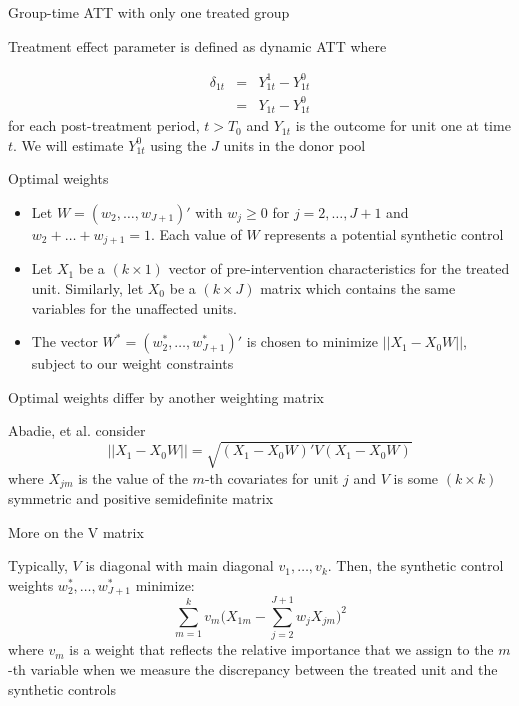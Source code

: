 \documentclass{beamer}
\begin{document}
\begin{frame}{Group-time ATT with only one treated group}

Treatment effect parameter is defined as dynamic ATT where 

\begin{eqnarray*}
\delta_{1t}&=&Y_{1t}^1 - Y_{1t}^0 \\
&=& Y_{1t} - Y_{1t}^0 
\end{eqnarray*} for each post-treatment period, $t>T_0$ and $Y_{1t}$ is the outcome for unit one at time $t$. We will estimate $Y^0_{1t}$ using the $J$ units in the donor pool 

\end{frame}

\begin{frame}{Optimal weights}
	
	\begin{itemize}
	\item Let $W=(w_2, \dots, w_{J+1})'$ with $w_j\geq 0$ for $j=2, \dots, J+1$ and $w_2+\dots+w_{j+1}=1$. Each value of $W$ represents a potential synthetic control
	\item Let $X_1$ be a $(k\times 1)$ vector of pre-intervention characteristics for the treated unit.  Similarly, let $X_0$ be a $(k\times J)$ matrix which contains the same variables for the unaffected units.
	\item The vector $W^*=(w_2^*, \dots, w_{J+1}^*)'$ is chosen to minimize $||X_1-X_0W||$, subject to our weight constraints
	\end{itemize}
\end{frame}

\begin{frame}{Optimal weights differ by another weighting matrix}
	
Abadie, et al. consider $$||X_1 - X_0W||=\sqrt{(X_1-X_0W)'V(X_1-X_0W)}$$where $X_{jm}$ is the value of the $m$-th covariates for unit $j$ and $V$ is some $(k\times k)$ symmetric and positive semidefinite matrix

\end{frame}

\begin{frame}{More on the V matrix}

Typically, $V$ is diagonal with main diagonal $v_1, \dots, v_k$.  Then, the synthetic control weights $w_2^*, \dots, w_{J+1}^*$ minimize: $$\sum_{m=1}^k v_m \bigg(X_{1m} - \sum_{j=2}^{J+1}w_jX_{jm}\bigg)^2$$ where $v_m$ is a weight that reflects the relative importance that we assign to the $m$-th variable when we measure the discrepancy between the treated unit and the synthetic controls

\end{frame}
\end{document}
